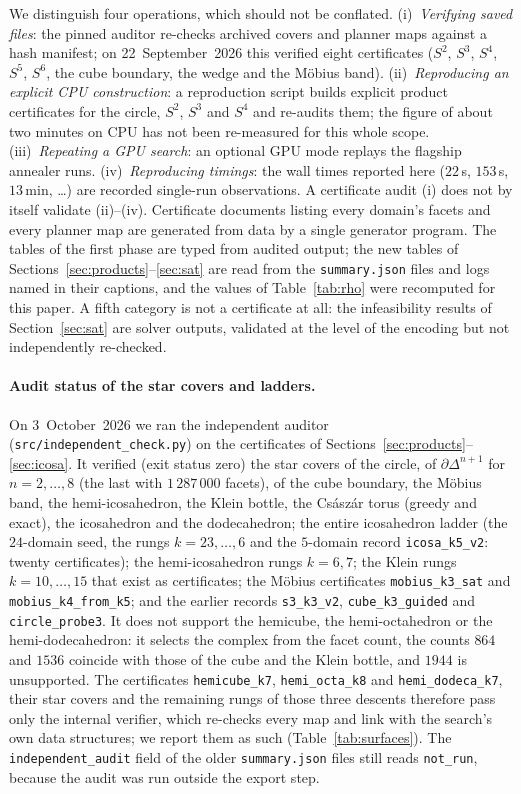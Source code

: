 \documentclass[12pt]{article}
\begin{document}
We distinguish four operations, which should not be conflated.
(i)~\emph{Verifying saved files}: the pinned auditor re-checks archived
covers and planner maps against a hash manifest; on 22~September~2026
this verified eight certificates ($S^2$, $S^3$, $S^4$, $S^5$, $S^6$, the cube
boundary, the wedge and the M\"obius band).  (ii)~\emph{Reproducing an explicit CPU
construction}: a reproduction script builds explicit product
certificates for the circle, $S^2$, $S^3$ and $S^4$ and re-audits them;
the figure of about two minutes on CPU has not been re-measured for
this whole scope.  (iii)~\emph{Repeating a GPU search}: an optional GPU
mode replays the flagship annealer runs.  (iv)~\emph{Reproducing
timings}: the wall times reported here ($22$\,s, $153$\,s, $13$\,min,
\dots) are recorded single-run observations.  A certificate audit
(i) does not by itself validate (ii)--(iv).  Certificate documents listing every domain's
facets and every planner map are generated from data by a single
generator program.  The tables of the first phase are typed from audited
output; the new tables of Sections~\ref{sec:products}--\ref{sec:sat} are
read from the \texttt{summary.json} files and logs named in their captions,
and the values of Table~\ref{tab:rho} were recomputed for this paper.  A
fifth category is not a certificate at all: the infeasibility results of
Section~\ref{sec:sat} are solver outputs, validated at the level of the
encoding but not independently re-checked.

\paragraph{Audit status of the star covers and ladders.}  On
3~October~2026 we ran the independent auditor
(\texttt{src/independent\_check.py}) on the certificates of
Sections~\ref{sec:products}--\ref{sec:icosa}.  It verified (exit status
zero) the star covers of the circle, of $\partial\Delta^{n+1}$ for
$n=2,\dots,8$ (the last with $1\,287\,000$ facets), of the cube boundary,
the M\"obius band, the hemi-icosahedron, the Klein bottle, the
Cs\'asz\'ar torus (greedy and exact), the icosahedron and the
dodecahedron; the entire icosahedron ladder (the $24$-domain seed, the
rungs $k=23,\dots,6$ and the $5$-domain record \texttt{icosa\_k5\_v2}:
twenty certificates); the hemi-icosahedron rungs $k=6,7$; the Klein
rungs $k=10,\dots,15$ that exist as certificates; the M\"obius
certificates \texttt{mobius\_k3\_sat} and \texttt{mobius\_k4\_from\_k5};
and the earlier records \texttt{s3\_k3\_v2}, \texttt{cube\_k3\_guided}
and \texttt{circle\_probe3}.  It does not support the hemicube, the
hemi-octahedron or the hemi-dodecahedron: it selects the complex from the
facet count, the counts $864$ and $1536$ coincide with those of the cube
and the Klein bottle, and $1944$ is unsupported.  The certificates
\texttt{hemicube\_k7}, \texttt{hemi\_octa\_k8} and
\texttt{hemi\_dodeca\_k7}, their star covers and the remaining rungs of
those three descents therefore pass only the internal verifier, which
re-checks every map and link with the search's own data structures; we
report them as such (Table~\ref{tab:surfaces}).  The
\texttt{independent\_audit} field of the older \texttt{summary.json}
files still reads \texttt{not\_run}, because the audit was run outside
the export step.
\end{document}

